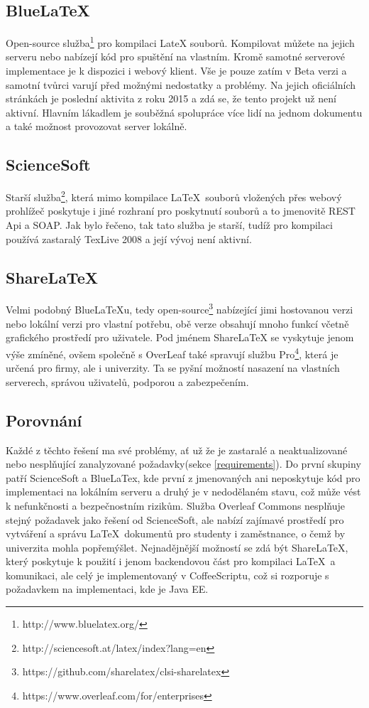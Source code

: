 \subsection{BlueLaTeX}
Open-source služba\footnote{http://www.bluelatex.org/} pro kompilaci LateX souborů. Kompilovat můžete na jejich serveru nebo nabízejí kód pro spuštění na vlastním. Kromě samotné serverové implementace je k dispozici i webový klient. Vše je pouze zatím v Beta verzi a samotní tvůrci varují před možnými nedostatky a problémy. Na jejich oficiálních stránkách je poslední aktivita z roku 2015 a zdá se, že tento projekt už není aktivní. Hlavním lákadlem je souběžná spolupráce více lidí na jednom dokumentu a také možnost provozovat server lokálně. 

\subsection{ScienceSoft}
Starší služba\footnote{http://sciencesoft.at/latex/index?lang=en}, která mimo kompilace \LaTeX\ souborů vložených přes webový prohlížeč poskytuje i jiné rozhraní pro poskytnutí souborů a to jmenovitě REST Api a SOAP. Jak bylo řečeno, tak tato služba je starší, tudíž pro kompilaci používá zastaralý TexLive 2008 a její vývoj není aktivní.

\subsection{ShareLaTeX}
Velmi podobný BlueLaTeXu, tedy open-source\footnote{https://github.com/sharelatex/clsi-sharelatex} nabízející jimi hostovanou verzi nebo lokální verzi pro vlastní potřebu, obě verze obsahují mnoho funkcí včetně grafického prostředí pro uživatele. Pod jménem ShareLaTeX se vyskytuje jenom výše zmíněné, ovšem společně s OverLeaf také spravují službu Pro\footnote{https://www.overleaf.com/for/enterprises}, která je určená pro firmy, ale i univerzity. Ta se pyšní možností nasazení na vlastních serverech, správou uživatelů, podporou a zabezpečením. 

\subsection{Porovnání}
Každé z těchto řešení ma své problémy, ať už že je zastaralé a neaktualizované nebo nesplňující zanalyzované požadavky(sekce \ref{requirements}). Do první skupiny patří ScienceSoft a BlueLaTex, kde první z jmenovaných ani neposkytuje kód pro implementaci na lokálním serveru a druhý je v nedodělaném stavu, což může vést k nefunkčnosti a bezpečnostním rizikům. Služba Overleaf Commons nesplňuje stejný požadavek jako řešení od ScienceSoft, ale nabízí zajímavé prostředí pro vytváření a správu \LaTeX\ dokumentů pro studenty i zaměstnance, o čemž by univerzita mohla popřemýšlet. Nejnadějnější možností se zdá být ShareLaTeX, který poskytuje k použití i jenom backendovou část pro kompilaci \LaTeX\ a komunikaci, ale celý je implementovaný v CoffeeScriptu, což si rozporuje s požadavkem na implementaci, kde je Java EE. 

